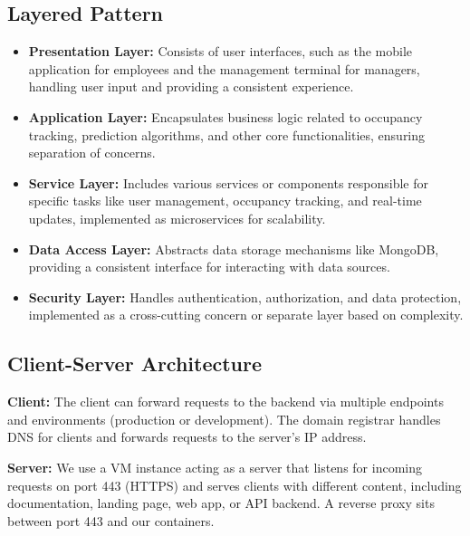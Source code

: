 \documentclass[11pt,a4paper]{article}
\begin{document}
\subsection*{Layered Pattern}
\begin{itemize}
    \item \textbf{Presentation Layer:} Consists of user interfaces, such as the mobile application for employees and the management terminal for managers, handling user input and providing a consistent experience.
    \item \textbf{Application Layer:} Encapsulates business logic related to occupancy tracking, prediction algorithms, and other core functionalities, ensuring separation of concerns.
    \item \textbf{Service Layer:} Includes various services or components responsible for specific tasks like user management, occupancy tracking, and real-time updates, implemented as microservices for scalability.
    \item \textbf{Data Access Layer:} Abstracts data storage mechanisms like MongoDB, providing a consistent interface for interacting with data sources.
    \item \textbf{Security Layer:} Handles authentication, authorization, and data protection, implemented as a cross-cutting concern or separate layer based on complexity.
\end{itemize}

\subsection*{Client-Server Architecture}
\textbf{Client:} The client can forward requests to the backend via multiple endpoints and environments (production or development). The domain registrar handles DNS for clients and forwards requests to the server's IP address.

\textbf{Server:} We use a VM instance acting as a server that listens for incoming requests on port 443 (HTTPS) and serves clients with different content, including documentation, landing page, web app, or API backend. A reverse proxy sits between port 443 and our containers.

\pagebreak
\end{document}
